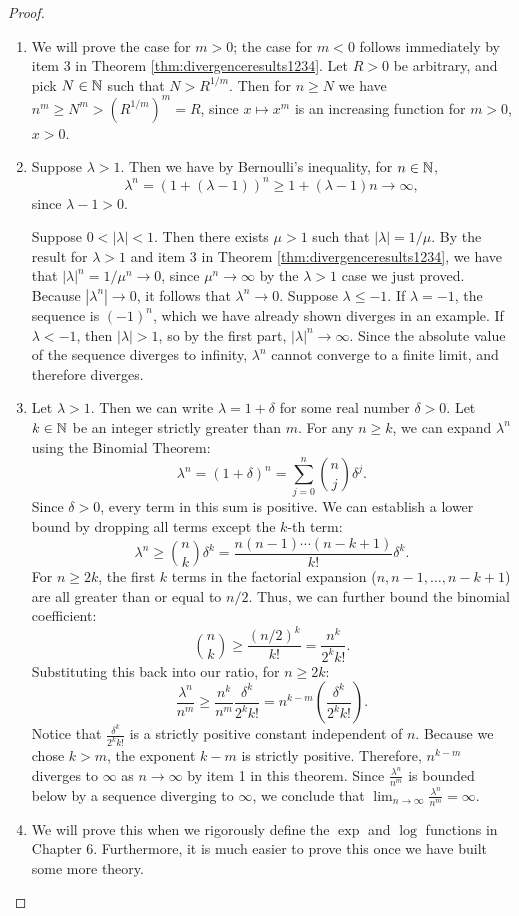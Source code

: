 \documentclass[../analysis1.tex]{subfiles}
\begin{document}
\begin{proof}
    \begin{enumerate}
        \item[1.] We will prove the case for $m>0$; the case for $m<0$ follows immediately by item 3 in Theorem \ref{thm:divergenceresults1234}. Let $R>0$ be arbitrary, and pick $N\in\mathbb{N}$ such that $N>R^{1/m}$. Then for $n\ge N$ we have $n^m\ge N^m > (R^{1/m})^m = R$, since $x\mapsto x^m$ is an increasing function for $m>0$, $x>0$.
        \item[2.] Suppose $\lambda>1$. Then we have by Bernoulli's inequality, for $n\in\mathbb{N}$, $$\lambda^n=(1+(\lambda-1))^n\ge 1+(\lambda-1)n\to\infty,$$since $\lambda-1>0$.\par
        Suppose $0 < |\lambda| < 1$. Then there exists $\mu > 1$ such that $|\lambda| = 1/\mu$. By the result for $\lambda > 1$ and item 3 in Theorem \ref{thm:divergenceresults1234}, we have that $|\lambda|^n = 1/\mu^n \to 0$, since $\mu^n \to \infty$ by the $\lambda>1$ case we just proved. Because $|\lambda^n| \to 0$, it follows that $\lambda^n \to 0$.
        Suppose $\lambda \le -1$. If $\lambda = -1$, the sequence is $(-1)^n$, which we have already shown diverges in an example. If $\lambda < -1$, then $|\lambda| > 1$, so by the first part, $|\lambda|^n \to \infty$. Since the absolute value of the sequence diverges to infinity, $\lambda^n$ cannot converge to a finite limit, and therefore diverges.
        \item[3.] Let $\lambda > 1$. Then we can write $\lambda = 1 + \delta$ for some real number $\delta > 0$. 
        Let $k \in \mathbb{N}$ be an integer strictly greater than $m$. 
        For any $n \ge k$, we can expand $\lambda^n$ using the Binomial Theorem:
        $$ \lambda^n = (1 + \delta)^n = \sum_{j=0}^n \binom{n}{j} \delta^j. $$
        Since $\delta > 0$, every term in this sum is positive. We can establish a lower bound by dropping all terms except the $k$-th term:
        $$ \lambda^n \ge \binom{n}{k} \delta^k = \frac{n(n-1)\cdots(n-k+1)}{k!} \delta^k. $$
        For $n \ge 2k$, the first $k$ terms in the factorial expansion ($n, n-1, \dots, n-k+1$) are all greater than or equal to $n/2$. Thus, we can further bound the binomial coefficient:
        $$ \binom{n}{k} \ge \frac{(n/2)^k}{k!} = \frac{n^k}{2^k k!}. $$
        Substituting this back into our ratio, for $n \ge 2k$:
        $$ \frac{\lambda^n}{n^m} \ge \frac{n^k}{n^m} \frac{\delta^k}{2^k k!} = n^{k-m} \left( \frac{\delta^k}{2^k k!} \right). $$
        Notice that $\frac{\delta^k}{2^k k!}$ is a strictly positive constant independent of $n$. Because we chose $k > m$, the exponent $k-m$ is strictly positive. Therefore, $n^{k-m}$ diverges to $\infty$ as $n \to \infty$ by item 1 in this theorem. 
        Since $\frac{\lambda^n}{n^m}$ is bounded below by a sequence diverging to $\infty$, we conclude that $\lim_{n \to \infty} \frac{\lambda^n}{n^m} = \infty$.
        \item[4.] We will prove this when we rigorously define the $\exp$ and $\log$ functions in Chapter 6. Furthermore, it is much easier to prove this once we have built some more theory.\qedhere
    \end{enumerate}
\end{proof}
\end{document}
